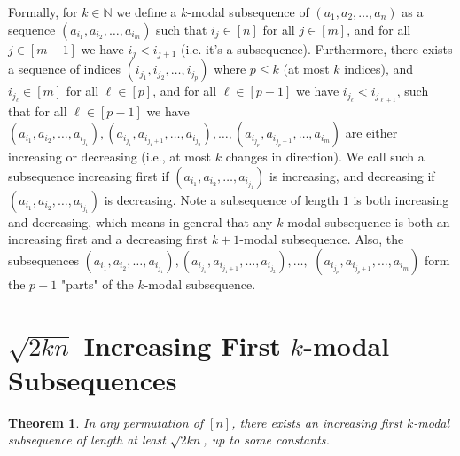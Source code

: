 \documentclass{article}
\newtheorem{theorem}{Theorem}
\begin{document}
Formally, for $k \in \mathbb{N}$ we define a $k$-modal subsequence of $(a_1, a_2, \ldots, a_n)$ as a sequence $(a_{i_1}, a_{i_2}, \ldots, a_{i_m})$ such that $i_j \in [n]$ for all $j \in [m]$, and for all $j \in [m-1]$ we have $i_j < i_{j+1}$ (i.e. it's a subsequence). Furthermore, there exists a sequence of indices $(i_{j_1}, i_{j_2}, \ldots, i_{j_p})$ where $p \leq k$ (at most $k$ indices), and $i_{j_{\ell}} \in [m]$ for all $\ell \in [p]$, and for all $\ell \in [p-1]$ we have $i_{j_{\ell}} < i_{j_{\ell+1}}$, such that for all $\ell \in [p-1]$ we have $(a_{i_1}, a_{i_2}, \ldots, a_{i_{j_1}}), (a_{i_{j_1}}, a_{i_{j_1 + 1}}, \ldots, a_{i_{j_2}}), \ldots, (a_{i_{j_p}}, a_{i_{j_p + 1}}, \ldots, a_{i_m})$ are either increasing or decreasing (i.e., at most $k$ changes in direction). We call such a subsequence increasing first if $(a_{i_1}, a_{i_2}, \ldots, a_{i_{j_1}})$ is increasing, and decreasing if $(a_{i_1}, a_{i_2}, \ldots, a_{i_{j_1}})$ is decreasing. Note a subsequence of length $1$ is both increasing and decreasing, which means in general that any $k$-modal subsequence is both an increasing first and a decreasing first $k+1$-modal subsequence. Also, the subsequences $(a_{i_1}, a_{i_2}, \ldots, a_{i_{j_1}}), (a_{i_{j_1}}, a_{i_{j_1 + 1}}, \ldots, a_{i_{j_2}}), \ldots,$ \newline $(a_{i_{j_p}}, a_{i_{j_p + 1}}, \ldots, a_{i_m})$ form the $p+1$ "parts" of the $k$-modal subsequence. \\

\section{$\sqrt{2kn}$ Increasing First $k$-modal Subsequences}

\begin{theorem}
In any permutation of $[n]$, there exists an increasing first $k$-modal subsequence of length at least $\sqrt{2kn}$, up to some constants. 
\end{theorem}
\end{document}
